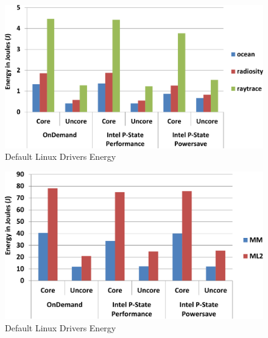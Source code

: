 \begin{figure}
  \begin{center}
\includegraphics[width=\linewidth]{figs/def-drivers-splash-crop.pdf}
  \end{center}
  \vspace{-0.1in}
  \caption{Default Linux Drivers Energy}
  \label{fig:sched-results}
\end{figure}

\begin{figure}
  \begin{center}
\includegraphics[width=\linewidth]{figs/def-drivers-micro-crop.pdf}
  \end{center}
  \vspace{-0.1in}
  \caption{Default Linux Drivers Energy}
  \label{fig:sched-results}
\end{figure}


